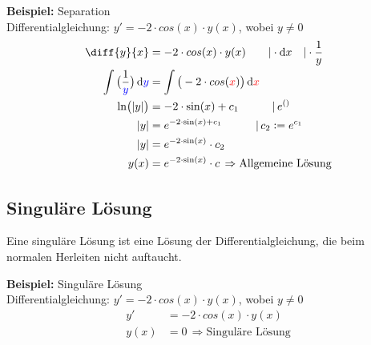 \documentclass[10pt,a4paper]{article}
\begin{document}
\begin{mdframed}
  \textbf{Beispiel:} Separation\\
  Differentialgleichung: $y' = -2 \cdot cos(x) \cdot y(x)$, wobei $y \neq 0$
  \begin{align*}
    \diff{y}{x} &= -2 \cdot cos(x) \cdot y(x) \qquad |\cdot \dif x \quad |\cdot \frac{1}{y}\\
    \int \big(\frac{1}{\textcolor{blue}{y}}\big) \dif \textcolor{blue}{y} &= \int \big(-2 \cdot cos(\textcolor{red}{x})\big) \dif \textcolor{red}{x}\\
    \ln(|y|) &= -2 \cdot \sin(x) + c_1 \qquad \quad | \, e^{()}\\
     |y| &= e^{-2 \cdot \sin(x) + c_1} \qquad \quad | \, c_2 := e^{c_1}\\
     |y| &= e^{-2 \cdot \sin(x)} \cdot c_2\\
     y(x) &= e^{-2 \cdot \sin(x)} \cdot c \, \Rightarrow \text{Allgemeine Lösung}
  \end{align*}
\end{mdframed}

\subsection{Singuläre Lösung}
Eine singuläre Lösung ist eine Lösung der Differentialgleichung, die beim normalen Herleiten nicht auftaucht.
\begin{mdframed}
  \textbf{Beispiel:} Singuläre Lösung\\
  Differentialgleichung: $y' = -2 \cdot cos(x) \cdot y(x)$, wobei $y \neq 0$
  \begin{align*}
     y' &= -2 \cdot cos(x) \cdot y(x)\\
     y(x) &= 0 \, \Rightarrow \text{Singuläre Lösung}
  \end{align*}
\end{mdframed}
\end{document}
